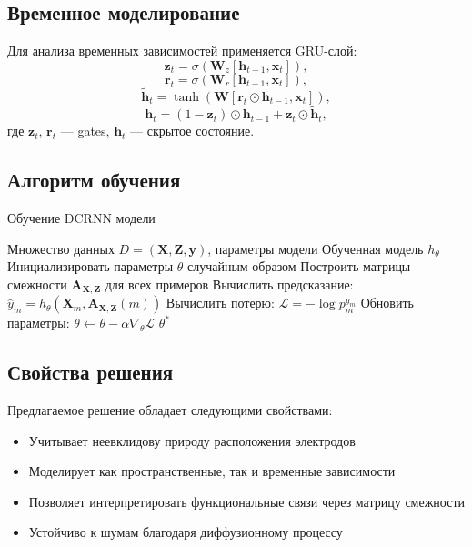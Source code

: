 \documentclass[12pt, twoside]{article}
\begin{document}
\subsection{Временное моделирование}

Для анализа временных зависимостей применяется GRU-слой:
\[
\mathbf{z}_t = \sigma(\mathbf{W}_z[\mathbf{h}_{t-1}, \mathbf{x}_t]),
\]
\[
\mathbf{r}_t = \sigma(\mathbf{W}_r[\mathbf{h}_{t-1}, \mathbf{x}_t]),
\]
\[
\tilde{\mathbf{h}}_t = \tanh(\mathbf{W}[\mathbf{r}_t \odot \mathbf{h}_{t-1}, \mathbf{x}_t]),
\]
\[
\mathbf{h}_t = (1-\mathbf{z}_t) \odot \mathbf{h}_{t-1} + \mathbf{z}_t \odot \tilde{\mathbf{h}}_t,
\]
где $\mathbf{z}_t$, $\mathbf{r}_t$ — gates, $\mathbf{h}_t$ — скрытое состояние.

\subsection{Алгоритм обучения}

\begin{algorithm}[H]
\caption{Обучение DCRNN модели}
\begin{algorithmic}[1]
\REQUIRE Множество данных $D = (\mathbf{X}, \mathbf{Z}, \mathbf{y})$, параметры модели
\ENSURE Обученная модель $h_\theta$
\STATE Инициализировать параметры $\theta$ случайным образом
\STATE Построить матрицы смежности $\mathbf{A}_{\mathbf{X}, \mathbf{Z}}$ для всех примеров
        \STATE Вычислить предсказание: $\hat{y}_m = h_\theta(\mathbf{X}_m, \mathbf{A}_{\mathbf{X}, \mathbf{Z}}(m))$
        \STATE Вычислить потерю: $\mathcal{L} = -\log p_m^{y_m}$
        \STATE Обновить параметры: $\theta \leftarrow \theta - \alpha \nabla_\theta \mathcal{L}$
    \ENDFOR
\ENDFOR
\RETURN $\theta^*$
\end{algorithmic}
\end{algorithm}

\subsection{Свойства решения}

Предлагаемое решение обладает следующими свойствами:
\begin{itemize}
    \item Учитывает неевклидову природу расположения электродов
    \item Моделирует как пространственные, так и временные зависимости
    \item Позволяет интерпретировать функциональные связи через матрицу смежности
    \item Устойчиво к шумам благодаря диффузионному процессу
\end{itemize}



\end{document}
